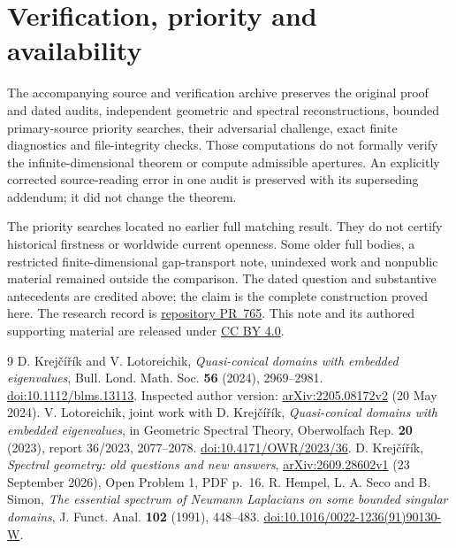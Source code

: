 \documentclass[11pt]{article}
\begin{document}
\section*{Verification, priority and availability}

The accompanying source and verification archive preserves the original
proof and dated audits, independent geometric and spectral
reconstructions, bounded primary-source priority searches, their
adversarial challenge, exact finite diagnostics and file-integrity
checks. Those computations do not formally verify the infinite-dimensional
theorem or compute admissible apertures. An explicitly corrected
source-reading error in one audit is preserved with its superseding
addendum; it did not change the theorem.

The priority searches located no earlier full matching result.
They do not certify historical firstness or worldwide current openness.
Some older full bodies, a restricted finite-dimensional gap-transport
note, unindexed work and nonpublic material remained outside the
comparison. The dated question and substantive antecedents are credited
above; the claim is the complete construction proved here.
The research record is
\href{https://github.com/AlecKriebel/Math/pull/765}{repository PR~765}.
This note and its authored supporting material are released under
\href{https://creativecommons.org/licenses/by/4.0/}{CC BY 4.0}.

\begin{thebibliography}{9}
D. Krej\v{c}\'i\v{r}\'ik and V. Lotoreichik,
\emph{Quasi-conical domains with embedded eigenvalues},
Bull. Lond. Math. Soc. \textbf{56} (2024), 2969--2981.
\href{https://doi.org/10.1112/blms.13113}{doi:10.1112/blms.13113}.
Inspected author version:
\href{https://arxiv.org/abs/2205.08172v2}{arXiv:2205.08172v2}
(20 May 2024).
V. Lotoreichik, joint work with D. Krej\v{c}\'i\v{r}\'ik,
\emph{Quasi-conical domains with embedded eigenvalues}, in
Geometric Spectral Theory, Oberwolfach Rep. \textbf{20} (2023),
report 36/2023, 2077--2078.
\href{https://doi.org/10.4171/OWR/2023/36}{doi:10.4171/OWR/2023/36}.
D. Krej\v{c}\'i\v{r}\'ik,
\emph{Spectral geometry: old questions and new answers},
\href{https://arxiv.org/abs/2609.28602v1}{arXiv:2609.28602v1}
(23 September 2026), Open Problem 1, PDF p.~16.
R. Hempel, L. A. Seco and B. Simon,
\emph{The essential spectrum of Neumann Laplacians on some bounded
singular domains}, J. Funct. Anal. \textbf{102} (1991), 448--483.
\href{https://doi.org/10.1016/0022-1236(91)90130-W}{doi:10.1016/0022-1236(91)90130-W}.
\end{thebibliography}
\end{document}
